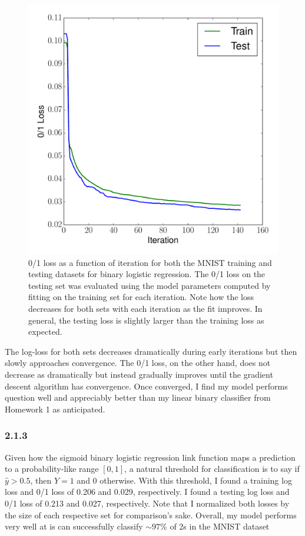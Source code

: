 \documentclass[12pt]{amsart}
\begin{document}
\begin{figure}[H]
	\includegraphics[width=\columnwidth]{mnist_bin_train_test_01.pdf}
    \caption{0/1 loss as a function of iteration for both the MNIST training and testing datasets for binary logistic regression.  The 0/1 loss on the testing set was evaluated using the model parameters computed by fitting on the training set for each iteration.  Note how the loss decreases for both sets with each iteration as the fit improves.  In general, the testing loss is slightly larger than the training loss as expected.}
    \label{fig:mnist_bin_01}
\end{figure}

The log-loss for both sets decreases dramatically during early iterations but then slowly approaches convergence.  The 0/1 loss, on the other hand, does not decrease as dramatically but instead gradually improves until the gradient descent algorithm has convergence.  Once converged, I find my model performs question well and appreciably better than my linear binary classifier from Homework 1 as anticipated.

\subsubsection*{2.1.3}
Given how the sigmoid binary logistic regression link function maps a prediction to a probability-like range $[0,1]$, a natural threshold for classification is to say if $\hat{y} > 0.5$, then $Y = 1$ and 0 otherwise.  With this threshold, I found a training log loss and 0/1 loss of 0.206 and 0.029, respectively.  I found a testing log loss and 0/1 loss of 0.213 and 0.027, respectively.  Note that I normalized both losses by the size of each respective set for comparison's sake.  Overall, my model performs very well at is can successfully classify ${\sim}97\%$ of 2s in the MNIST dataset
\end{document}
